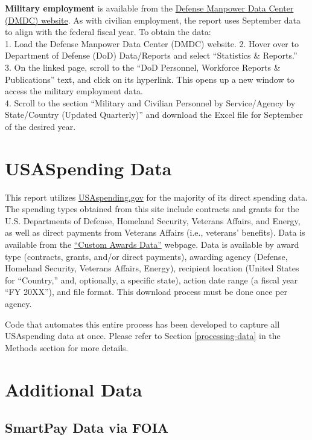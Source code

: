 \documentclass[
]{book}
\begin{document}
\textbf{Military employment} is available from the \href{https://dwp.dmdc.osd.mil/dwp/app/main}{Defense Manpower Data Center (DMDC) website}. As with civilian employment, the report uses September data to align with the federal fiscal year. To obtain the data:\\
1. Load the Defense Manpower Data Center (DMDC) website.
2. Hover over to Department of Defense (DoD) Data/Reports and select ``Statistics \& Reports.''\\
3. On the linked page, scroll to the ``DoD Personnel, Workforce Reports \& Publications'' text, and click on its hyperlink. This opens up a new window to access the military employment data.\\
4. Scroll to the section ``Military and Civilian Personnel by Service/Agency by State/Country (Updated Quarterly)'' and download the Excel file for September of the desired year.

\hypertarget{usa}{%
\section{USASpending Data}\label{usa}}

This report utilizes \href{https://www.usaspending.gov/}{USAspending.gov} for the majority of its direct spending data. The spending types obtained from this site include contracts and grants for the U.S. Departments of Defense, Homeland Security, Veterans Affairs, and Energy, as well as direct payments from Veterans Affairs (i.e., veterans' benefits). Data is available from the \href{https://www.usaspending.gov/download_center/custom_award_data}{``Custom Awards Data''} webpage. Data is available by award type (contracts, grants, and/or direct payments), awarding agency (Defense, Homeland Security, Veterans Affairs, Energy), recipient location (United States for ``Country,'' and, optionally, a specific state), action date range (a fiscal year ``FY 20XX''), and file format. This download process must be done once per agency.

Code that automates this entire process has been developed to capture all USAspending data at once. Please refer to Section \ref{processing-data} in the Methods section for more details.

\hypertarget{additional}{%
\section{Additional Data}\label{additional}}

\hypertarget{smartpay}{%
\subsection{SmartPay Data via FOIA}\label{smartpay}}
\end{document}
